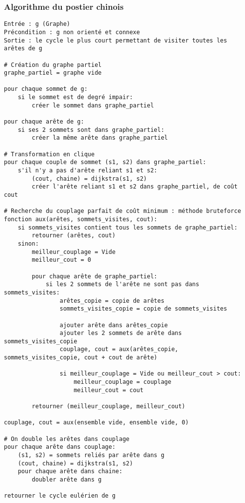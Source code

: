 \documentclass{scrartcl}
\begin{document}
    \subsubsection{Algorithme du postier chinois}
      \begin{lstlisting}
Entrée : g (Graphe)
Précondition : g non orienté et connexe
Sortie : le cycle le plus court permettant de visiter toutes les arêtes de g

# Création du graphe partiel
graphe_partiel = graphe vide

pour chaque sommet de g:
    si le sommet est de degré impair:
        créer le sommet dans graphe_partiel

pour chaque arête de g:
    si ses 2 sommets sont dans graphe_partiel:
        créer la même arête dans graphe_partiel

# Transformation en clique
pour chaque couple de sommet (s1, s2) dans graphe_partiel:
    s'il n'y a pas d'arête reliant s1 et s2:
        (cout, chaine) = dijkstra(s1, s2)
        créer l'arête reliant s1 et s2 dans graphe_partiel, de coût cout

# Recherche du couplage parfait de coût minimum : méthode bruteforce
fonction aux(arêtes, sommets_visites, cout):
    si sommets_visites contient tous les sommets de graphe_partiel:
        retourner (arêtes, cout)
    sinon:
        meilleur_couplage = Vide
        meilleur_cout = 0

        pour chaque arête de graphe_partiel:
            si les 2 sommets de l'arête ne sont pas dans sommets_visites:
                arêtes_copie = copie de arêtes
                sommets_visites_copie = copie de sommets_visites

                ajouter arête dans arêtes_copie
                ajouter les 2 sommets de arête dans sommets_visites_copie
                couplage, cout = aux(arêtes_copie, sommets_visites_copie, cout + cout de arête)

                si meilleur_couplage = Vide ou meilleur_cout > cout:
                    meilleur_couplage = couplage
                    meilleur_cout = cout

        retourner (meilleur_couplage, meilleur_cout)

couplage, cout = aux(ensemble vide, ensemble vide, 0)

# On double les arêtes dans couplage
pour chaque arête dans couplage:
    (s1, s2) = sommets reliés par arête dans g
    (cout, chaine) = dijkstra(s1, s2)
    pour chaque arête dans chaine:
        doubler arête dans g

retourner le cycle eulérien de g
      \end{lstlisting}
\end{document}
